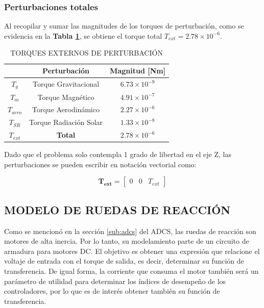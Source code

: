 \subsubsection{Perturbaciones totales}
\hfill \break
Al recopilar y sumar las magnitudes de los torques de perturbación, como se evidencia en la \textbf{Tabla \ref{table:pertubaciones}}, se obtiene el torque total $T_{ext} = 2.78\times10^{-6}$. 

\begin{table}[h]
	\caption{\MakeUppercase{Torques externos de perturbación }}
	\begin{center}
		\begin{tabular}{ c c c}
			
			 &  \textbf{Perturbación} &  \textbf{Magnitud [Nm]}\\ \hline
			$T_g$ &  Torque Gravitacional & $6.73\times10^{-9}$ \\ 
			$T_m$ &  Torque Magnético & $4.91\times10^{-7}$ \\ 
			$T_{aero}$ &  Torque Aerodinámico & $2.27\times10^{-6}$ \\ 
			$T_{SR}$ &  Torque  Radiación Solar& $1.33\times10^{-8}$ \\ \hline
			\mbox{\boldmath$T_{ext}$} &  \textbf{Total}& \mbox{\boldmath$2.78\times10^{-6}$} \\
		\end{tabular}
	\end{center}
	\label{table:pertubaciones}
\end{table}

Dado que el problema solo contempla 1 grado de libertad en el eje Z, las perturbaciones se pueden escribir en notación vectorial como:

\begin{equation}\label{eq:torquePerturbacionVec}
	\boldsymbol{T_{ext}}=\left[\begin{array}{lll}
		0 & 0 & T_{ext}
	\end{array}\right]
\end{equation}

\subsection{MODELO DE RUEDAS DE REACCIÓN}

Como se mencionó en la sección \ref{sub:adcs} del ADCS, las ruedas de reacción son motores de alta inercia. Por lo tanto, su modelamiento parte de un circuito de armadura para motores DC. El objetivo es obtener una expresión que relacione el voltaje de entrada con el torque de salida, es decir, determinar su función de transferencia. De igual forma, la corriente que consuma el motor también será un parámetro de utilidad para determinar los índices de desempeño de los controladores, por lo que es de interés obtener también su función de transferencia.
 
